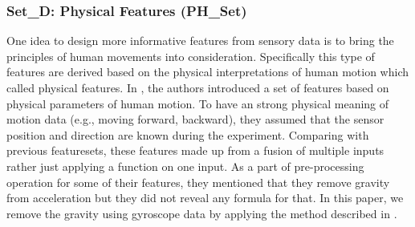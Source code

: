 \documentclass[journal,article,submit,moreauthors,pdftex]{Definitions/mdpi}
\newcommand{\hosein}[1]{\textcolor{orange}{{\it [Hosein: #1]}}}
\begin{document}
\subsubsection{Set\_D: Physical Features (PH\_Set)}
One idea to design more informative features from sensory data is to bring the principles of human movements into consideration. Specifically this type of features are derived based on the physical interpretations of human motion which called physical features. In \cite{zhang2011feature}, the authors introduced a set of features based on physical parameters of human motion. To have an strong physical meaning of motion data (e.g., moving forward, backward), they assumed that the sensor position and direction are known during the experiment. Comparing with previous featuresets, these features made up from a fusion of multiple inputs rather just applying a function on one input. As a part of pre-processing operation for some of their features, they mentioned that they remove gravity from acceleration but they did not reveal any formula for that. In this paper, we remove the gravity using gyroscope data by applying the method described in \cite{Accelero5:online}.
%
\end{document}
